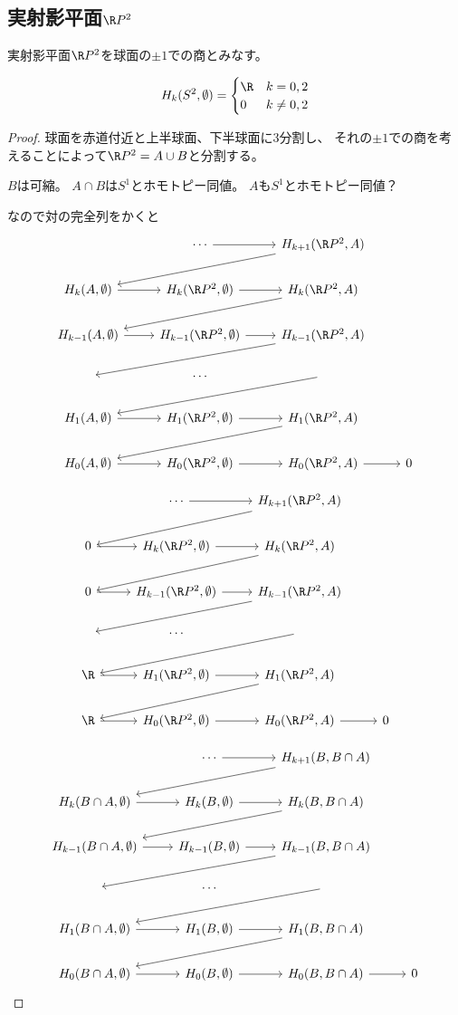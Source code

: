 \documentclass{jsarticle}
\begin{document}
\subsection{実射影平面$\R P^2$}
実射影平面$\R P^2$を球面の$\pm1$での商とみなす。

\begin{prop}
\[
H_k(S^2,\emptyset)=\begin{cases}\R&k=0,2\\0&k\neq 0,2\end{cases}
\]
\end{prop}
\begin{proof}
球面を赤道付近と上半球面、下半球面に3分割し、
それの$\pm 1$での商を考えることによって$\R P^2=A\cup B$と分割する。

$B$は可縮。
$A\cap B$は$S^1$とホモトピー同値。
$A$も$S^1$とホモトピー同値？

なので対の完全列をかくと
\[
\begin{tikzcd}
~ &\cdots \ar[r] &H_{k+1}(\R P^2,A) \ar[dll]\\
H_k(A,\emptyset) \ar[r] &H_k(\R P^2,\emptyset) \ar[r] &H_k(\R P^2,A) \ar[dll]\\
H_{k-1}(A,\emptyset) \ar[r] &H_{k-1}(\R P^2,\emptyset) \ar[r] &H_{k-1}(\R P^2,A) \ar[dll]\\
~&\cdots&\ar[dll]\\
H_{1}(A,\emptyset) \ar[r] &H_{1}(\R P^2,\emptyset) \ar[r] &H_{1}(\R P^2,A) \ar[dll]\\
H_{0}(A,\emptyset) \ar[r] &H_{0}(\R P^2,\emptyset) \ar[r] &H_{0}(\R P^2,A) \ar[r]&0
\end{tikzcd}
\]

\[
\begin{tikzcd}
~ &\cdots \ar[r] &H_{k+1}(\R P^2,A) \ar[dll]\\
0 \ar[r] &H_k(\R P^2,\emptyset) \ar[r] &H_k(\R P^2,A) \ar[dll]\\
0 \ar[r] &H_{k-1}(\R P^2,\emptyset) \ar[r] &H_{k-1}(\R P^2,A) \ar[dll]\\
~&\cdots&\ar[dll]\\
\R \ar[r] &H_{1}(\R P^2,\emptyset) \ar[r] &H_{1}(\R P^2,A) \ar[dll]\\
\R \ar[r] &H_{0}(\R P^2,\emptyset) \ar[r] &H_{0}(\R P^2,A) \ar[r]&0
\end{tikzcd}
\]

\[
\begin{tikzcd}
~ &\cdots \ar[r] &H_{k+1}(B,B\cap A) \ar[dll]\\
H_k(B\cap A,\emptyset) \ar[r] &H_k(B,\emptyset) \ar[r] &H_k(B,B\cap A) \ar[dll]\\
H_{k-1}(B\cap A,\emptyset) \ar[r] &H_{k-1}(B,\emptyset) \ar[r] &H_{k-1}(B,B\cap A) \ar[dll]\\
~&\cdots&\ar[dll]\\
H_{1}(B\cap A,\emptyset) \ar[r] &H_{1}(B,\emptyset) \ar[r] &H_{1}(B,B\cap A) \ar[dll]\\
H_{0}(B\cap A,\emptyset) \ar[r] &H_{0}(B,\emptyset) \ar[r] &H_{0}(B,B\cap A) \ar[r]&0
\end{tikzcd}
\]


\end{proof}
\end{document}
